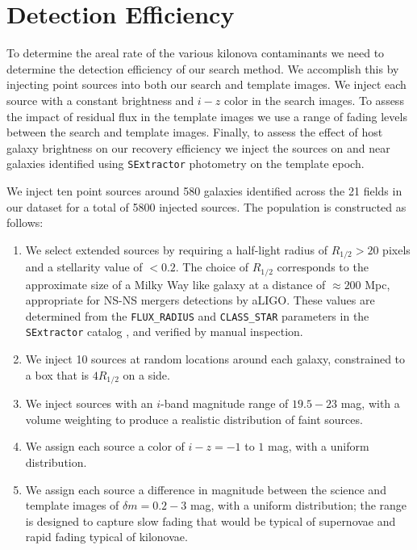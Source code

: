\section{Detection Efficiency}
\label{sec:fakes}
To determine the areal rate of the various kilonova contaminants we need to determine the detection efficiency of our search method. We accomplish this by injecting point sources into both our search and template images. We inject each source with a constant brightness and $i-z$ color in the search images. To assess the impact of residual flux in the template images we use a range of fading levels between the search and template images.  Finally, to assess the effect of host galaxy brightness on our recovery efficiency we inject the sources on and near galaxies identified using {\tt SExtractor} photometry on the template epoch. 

We inject ten point sources around 580 galaxies identified across the 21 fields in our dataset for a total of 5800 injected sources. The population is constructed as follows:

\begin{enumerate}
\item We select extended sources by requiring a half-light radius of $R_{1/2} > 20$ pixels and a stellarity value of $<0.2$. The choice of $R_{1/2}$ corresponds to the approximate size of a Milky Way like galaxy at a distance of $\approx 200$ Mpc, appropriate for NS-NS mergers detections by aLIGO. These values are determined from the {\tt FLUX\_RADIUS} and {\tt CLASS\_STAR} parameters in the {\tt SExtractor} catalog \citep{bertin96}, and verified by manual inspection.

\item We inject 10 sources at random locations around each galaxy, constrained to a box that is $4R_{1/2}$ on a side.

\item We inject sources with an $i$-band magnitude range of $19.5-23$ mag, with a volume weighting to produce a realistic distribution of faint sources.

\item We assign each source a color of $i-z=-1$ to $1$ mag, with a uniform distribution.

\item We assign each source a difference in magnitude between the science and template images of $\delta m= 0.2-3$ mag, with a uniform distribution; the range is designed to capture slow fading that would be typical of supernovae and rapid fading typical of kilonovae.

\end{enumerate}

